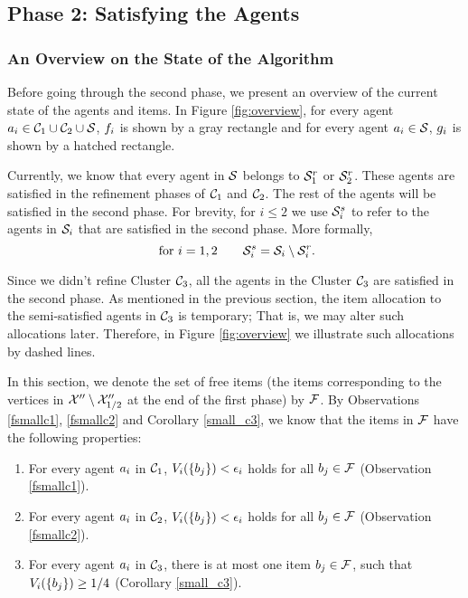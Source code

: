 \subsection{Phase 2: Satisfying the Agents}\label{additive:allocation}
\subsubsection{An Overview on the State of the Algorithm}
Before going through the second phase, we present an overview of the current state of the agents and items. In Figure \ref{fig:overview}, for every agent $a_i \in \mathcal{C}_1 \cup \mathcal{C}_2 \cup \mathcal{S}$, $f_i$ is shown by a gray rectangle and for every agent $a_i \in \mathcal{S}$, $g_i$  is shown by a hatched rectangle. 

Currently, we know that every agent in $\mathcal{S}$ belongs to $\mathcal{S}_1^r$ or $\mathcal{S}_2^r$. These agents are satisfied in the refinement phases of $\mathcal{C}_1$ and $\mathcal{C}_2$. The rest of the agents will be satisfied in the second phase. For brevity, for $i \leq 2$ we use $\mathcal{S}_i^s$ to refer to the agents in $\mathcal{S}_i$ that are satisfied in the second phase. More formally, $$\mbox{ for }i=1,2 \qquad \mathcal{S}_i^s = \mathcal{S}_i \setminus \mathcal{S}_i^r .$$

Since we didn't refine Cluster $\mathcal{C}_3$, all the agents in the Cluster $\mathcal{C}_3$ are satisfied in the second phase. As mentioned in the previous section, the item allocation to the semi-satisfied agents in $\mathcal{C}_3$ is temporary; That is, we may alter such allocations later. Therefore, in Figure \ref{fig:overview} we illustrate such allocations by dashed lines. 

 

In this section, we denote the set of free items (the items corresponding to the vertices in $\mathcal{X}''\setminus \mathcal{X}''_{1/2}$ at the end of the first phase) by $\mathcal{F}$. By Observations \ref{fsmallc1}, \ref{fsmallc2} and Corollary \ref{small_c3}, we know that the items in $\mathcal{F}$ have the following properties:
\begin{enumerate}
\item For every agent $a_i$ in $\mathcal{C}_1$, $V_i(\{b_j\}) < \epsilon_i$ holds for all $b_j \in \mathcal{F}$ (Observation \ref{fsmallc1}).
\item For every agent $a_i$ in $\mathcal{C}_2$, $V_i(\{b_j\}) < \epsilon_i$ holds for all $b_j \in \mathcal{F}$ (Observation \ref{fsmallc2}).
\item For every agent $a_i$ in $\mathcal{C}_3$, there is at most one item $b_j \in \mathcal{F}$, such that $V_i(\{b_j\}) \geq 1/4$ (Corollary \ref{small_c3}).
\end{enumerate}


